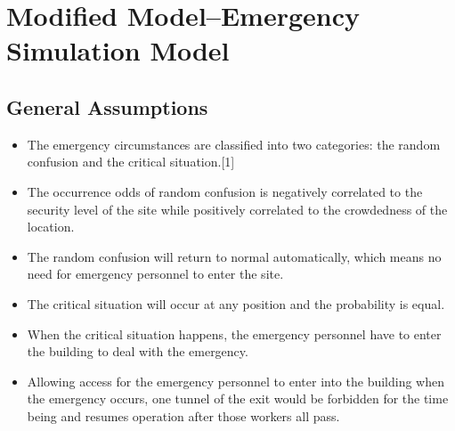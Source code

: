 \documentclass{mcmthesis}
\begin{document}
\section{Modified Model--Emergency Simulation Model}
\subsection{General Assumptions}
\begin{itemize}
	\item The emergency circumstances are classified into two categories: the random confusion and the critical situation.[1]
	\item The occurrence odds of random confusion is negatively correlated to the security level of the site while positively correlated to the crowdedness of the location.
	\item The random confusion will return to normal automatically, which means no need for emergency personnel to enter the site.
	\item The critical situation will occur at any position and the probability is equal.
	\item When the critical situation happens, the emergency personnel have to enter the building to deal with the emergency.
	\item Allowing access for the emergency personnel to enter into the building when the emergency occurs, one tunnel of the exit would be forbidden for the time being and resumes operation after those workers all pass.
\end{itemize}
\newpage
\end{document}
